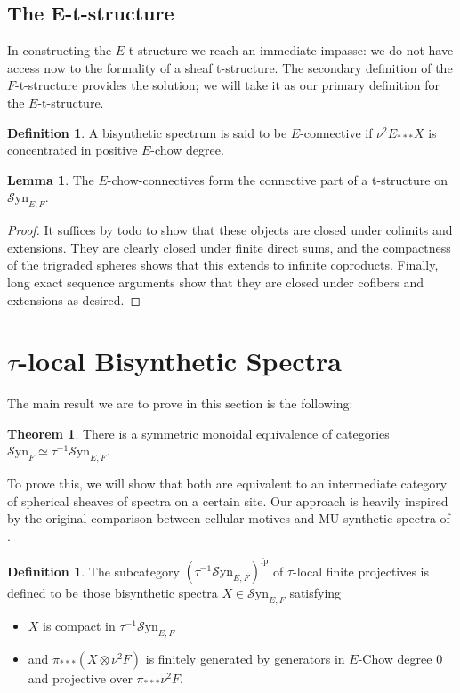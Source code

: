 \documentclass[10pt]{amsart}
\theoremstyle{definition}
\numberwithin{figure}{section}
\numberwithin{equation}{section}
\newtheorem{theorem}[figure]{Theorem}
\newtheorem{lemma}[figure]{Lemma}
\newtheorem{definition}[figure]{Definition}
\newcommand{\MU}{\mathrm{MU}}
\theoremstyle{cited}
\newcommand{\fp}{\mathrm{fp}}
\newcommand{\Syn}{\mathcal{S}\mathrm{yn}}
\begin{document}
\subsection{The E-t-structure}

In constructing the $E$-t-structure we reach an immediate impasse: we do not have access now to the formality of a sheaf t-structure. The secondary definition of the $F$-t-structure provides the solution; we will take it as our primary definition for the $E$-t-structure.

\begin{definition}
  A bisynthetic spectrum is said to be $E$-connective if $\nu^2E_{***}X$ is concentrated in positive $E$-chow degree.
\end{definition}

\begin{lemma}
  The $E$-chow-connectives form the connective part of a t-structure on $\Syn_{E,F}$.
\end{lemma}

\begin{proof}
  It suffices by todo to show that these objects are closed under colimits and extensions. They are clearly closed under finite direct sums, and the compactness of the trigraded spheres shows that this extends to infinite coproducts. Finally, long exact sequence arguments show that they are closed under cofibers and extensions as desired.
\end{proof}

  
\section{$\tau$-local Bisynthetic Spectra}

The main result we are to prove in this section is the following:

\begin{theorem}
  \label{thm:taulocal}
  There is a symmetric monoidal equivalence of categories $\Syn_F\simeq \tau^{-1}\Syn_{E,F}$.
\end{theorem}

To prove this, we will show that both are equivalent to an intermediate category of spherical sheaves of spectra on a certain site. Our approach is heavily inspired by the original comparison between cellular motives and $\MU$-synthetic spectra of \cite{Pst22}.

\begin{definition}
  The subcategory $(\tau^{-1}\Syn_{E,F})^\fp$ of $\tau$-local finite projectives is defined to be those bisynthetic spectra $X\in \Syn_{E,F}$ satisfying
  \begin{itemize}
    \item $X$ is compact in $\tau^{-1}\Syn_{E,F}$
    \item and $\pi_{***}(X\otimes \nu^2F)$ is finitely generated by generators in $E$-Chow degree $0$ and projective over $\pi_{***}\nu^2F$. 
  \end{itemize}
\end{definition}
\end{document}
